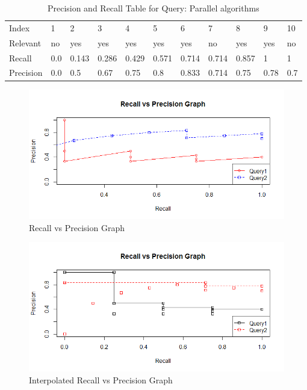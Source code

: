 \documentclass[12pt]{report}
\begin{document}
\begin{table}[]
\centering
\caption{Precision and Recall Table for Query: Parallel algorithms }
\label{my-label}
\begin{tabular}{lllllllllll}
Index     & 1   & 2     & 3     & 4     & 5     & 6     & 7     & 8     & 9    & 10  \\
Relevant  & no  & yes   & yes   & yes   & yes   & yes   & no    & yes   & yes  & no  \\
Recall    & 0.0 & 0.143 & 0.286 & 0.429 & 0.571 & 0.714 & 0.714 & 0.857 & 1    & 1   \\
Precision & 0.0 & 0.5   & 0.67  & 0.75  & 0.8   & 0.833 & 0.714 & 0.75  & 0.78 & 0.7
\end{tabular}
\end{table}

\begin{figure}[ht]
  \centering
  \includegraphics[width=1\textwidth]{Problem8_4/RecallvsPrecision.png}
  \caption{Recall vs Precision Graph}
  \label{fig:1}
\end{figure} 

\begin{figure}[ht]
  \centering
  \includegraphics[width=1\textwidth]{Problem8_4/InterpolatedRecallvsPrecision.png}
  \caption{Interpolated Recall vs Precision Graph}
  \label{fig:1}
\end{figure}
\end{document}
